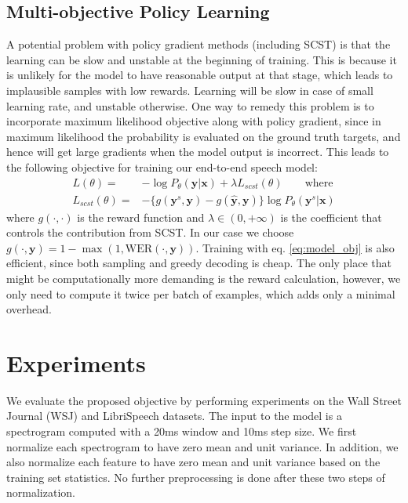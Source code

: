\documentclass{article}
\begin{document}
\subsection{Multi-objective Policy Learning}
A potential problem with policy gradient methods (including SCST) is that the learning can be slow and unstable at the beginning of training. This is because it is unlikely for the model to have reasonable output at that stage, which leads to implausible samples with low rewards. Learning will be slow in case of small learning rate, and unstable otherwise. One way to remedy this problem is to incorporate maximum likelihood objective along with policy gradient, since in maximum likelihood the probability is evaluated on the ground truth targets, and hence will get large gradients when the model output is incorrect. This leads to the following objective for training our end-to-end speech model:
\begin{align}
\label{eq:model_obj}
L(\theta) = & - \log P_\theta(\mathbf{y}|\mathbf{x}) + \lambda L_{scst}(\theta) \qquad \text{where}\\
\nonumber
L_{scst}(\theta) = & - \{g(\mathbf{y}^s, \mathbf{y}) - g(\hat{\mathbf{y}}, \mathbf{y})\}\log P_\theta(\mathbf{y}^s|\mathbf{x})
\end{align}
where $g(\cdot,\cdot)$ is the reward function and $\lambda \in (0, +\infty)$ is the coefficient that controls the contribution from SCST. In our case we choose $g(\cdot, \mathbf{y}) = 1 - \max(1, \text{WER}(\cdot, \mathbf{y}))$. Training with eq. \ref{eq:model_obj} is also efficient, since both sampling and greedy decoding is cheap. The only place that might be computationally more demanding is the reward calculation, however, we only need to compute it twice per batch of examples, which adds only a minimal overhead.


\section{Experiments}
\label{sec:exp}
We evaluate the proposed objective by performing experiments on the Wall Street Journal (WSJ) and LibriSpeech \cite{panayotov2015librispeech} datasets. The input to the model is a spectrogram computed with a 20ms window and 10ms step size.
We first normalize each spectrogram to have zero mean and unit variance. In addition, we also normalize each feature to have zero mean and unit variance based on the training set statistics. No further preprocessing is done after these two steps of normalization. 
\end{document}
